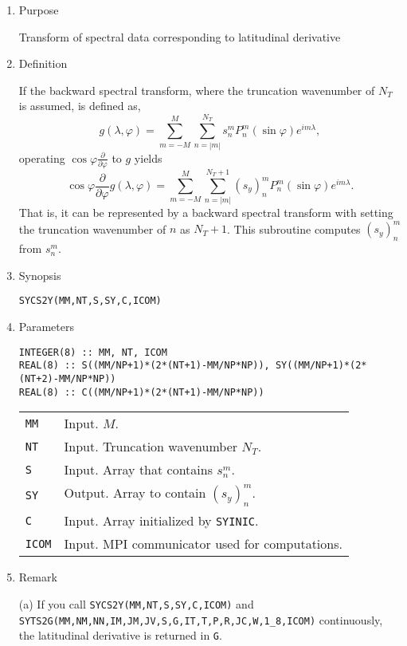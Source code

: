 \documentclass[a4paper]{scrartcl}
\begin{document}
\begin{enumerate}

\item Purpose 

Transform of spectral data 
corresponding to latitudinal derivative

\item Definition

If the backward spectral transform, where the truncation
  wavenumber of $N_T$ is assumed, is defined as,
\begin{equation}
g(\lambda,\varphi)=\sum^M_{m=-M}\sum^{N_T}_{n=|m|}
s^m_nP^m_n(\sin\varphi)e^{im\lambda},
\end{equation}
operating $\cos\varphi\frac{\partial}{\partial\varphi}$ to
$g$ yields
\begin{equation}
\cos\varphi\frac{\partial}{\partial\varphi}
g(\lambda,\varphi)=\sum^M_{m=-M}\sum^{N_T+1}_{n=|m|}
(s_y)^m_nP^m_n(\sin\varphi)e^{im\lambda}.
\end{equation}
That is, it can be represented by a backward spectral transform
with setting the truncation wavenumber of $n$ as $N_T+1$.
This subroutine computes $(s_y)^m_n$ from $s^m_n$.

\item Synopsis 

\texttt{SYCS2Y(MM,NT,S,SY,C,ICOM)}
  
\item Parameters

\begin{verbatim}
INTEGER(8) :: MM, NT, ICOM
REAL(8) :: S((MM/NP+1)*(2*(NT+1)-MM/NP*NP)), SY((MM/NP+1)*(2*(NT+2)-MM/NP*NP))
REAL(8) :: C((MM/NP+1)*(2*(NT+1)-MM/NP*NP))
\end{verbatim}

\begin{tabular}{ll}
\texttt{MM} & Input. $M$.\\  
\texttt{NT} & Input. Truncation wavenumber $N_T$.\\
\texttt{S} & Input. Array that contains $s^m_n$.\\
\texttt{SY} & Output. Array to contain $(s_y)^m_n$.\\
\texttt{C} & Input. Array initialized by  \texttt{SYINIC}.\\
\texttt{ICOM} & Input. MPI communicator used for computations.
\end{tabular}

\item Remark

    (a) If you call
  \texttt{SYCS2Y(MM,NT,S,SY,C,ICOM)} and \\
  \texttt{SYTS2G(MM,NM,NN,IM,JM,JV,S,G,IT,T,P,R,JC,W,1\_8,ICOM)}
    continuously, the latitudinal derivative is returned in \texttt{G}.  
    
\end{enumerate}
\end{document}
